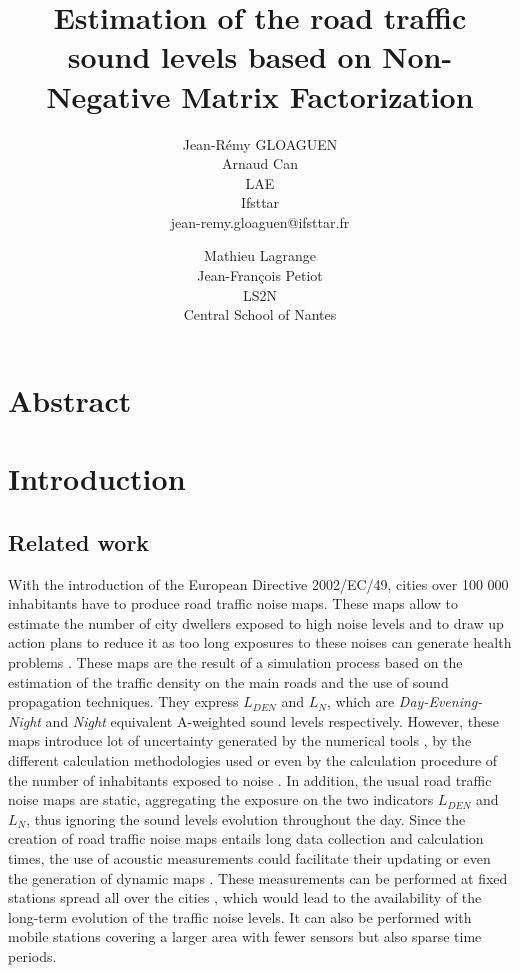 \documentclass[twocolumn,a4paper,10pt]{article}
\title{Estimation of the road traffic sound levels based on Non-Negative Matrix Factorization}
\author{
    Jean-Rémy GLOAGUEN\\
    Arnaud Can\\
    LAE\\
    Ifsttar\\
    jean-remy.gloaguen@ifsttar.fr
  \and
    Mathieu Lagrange\\
	Jean-François Petiot \\
    LS2N\\
    Central School of Nantes\\
}
\date{}
\newcommand{\ml}[1]{\textcolor{blue}{ Mathieu: #1}}
\begin{document}
\maketitle

\section*{Abstract}

\section{Introduction}
\subsection{Related work}
With the introduction of the European Directive 2002/EC/49, cities over 100 000 inhabitants have to produce road traffic noise maps. These maps allow to estimate the number of city dwellers exposed to high noise levels and to draw up action plans to reduce it as too long exposures to these noises can generate health problems \cite{who_burden_2017}. These maps are the result of a simulation process based on the estimation of the traffic density on the main roads and the use of sound propagation techniques. They express $L_ {DEN}$ and $L_N$, which are \textit{Day-Evening-Night} and \textit{Night} equivalent A-weighted sound levels respectively. However, these maps introduce lot of uncertainty generated by the numerical tools \cite{van_leeuwen_noise_2015}, by the different calculation methodologies used \cite{leroy_uncertainty_2010}\cite{garg_critical_2014} or even by the calculation procedure of the number of inhabitants exposed to noise \cite{king_implementation_2011}. In addition, the usual road traffic noise maps are static, aggregating the exposure on the two indicators $L_{DEN}$ and $L_N$, thus ignoring the sound levels evolution throughout the day. Since the creation of road traffic noise maps entails long data collection and calculation times, the use of acoustic measurements could facilitate their updating or even the generation of dynamic maps \cite{wei_dynamic_2016}. These measurements can be performed at fixed stations spread all over the cities \cite{Mioduszewski} \cite{mietlicki2012innovative}, which would lead to the availability of the long-term evolution of the traffic noise levels. It can also be performed with  mobile stations \cite{can_exploring_2012} \cite{manvell2004sadmam} covering a larger area with fewer sensors but also sparse time periods. %
\end{document}
